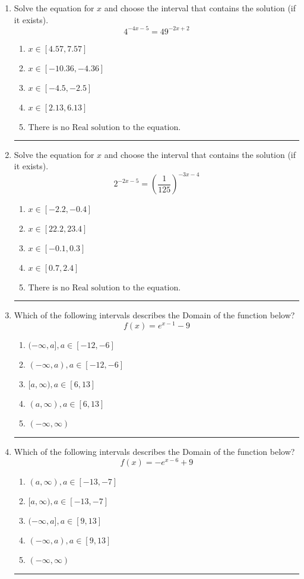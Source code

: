 \documentclass[14pt]{extbook}
\newcommand{\litem}[1]{\item#1\hspace*{-1cm}\rule{\textwidth}{0.4pt}}
\begin{document}
\begin{enumerate}
\litem{
Solve the equation for $x$ and choose the interval that contains the solution (if it exists).\[ 4^{-4x-5} = 49^{-2x+2} \]\begin{enumerate}[label=\Alph*.]
\item \( x \in [4.57, 7.57] \)
\item \( x \in [-10.36, -4.36] \)
\item \( x \in [-4.5, -2.5] \)
\item \( x \in [2.13, 6.13] \)
\item \( \text{There is no Real solution to the equation.} \)

\end{enumerate} }
\litem{
Solve the equation for $x$ and choose the interval that contains the solution (if it exists).\[ 2^{-2x-5} = \left(\frac{1}{125}\right)^{-3x-4} \]\begin{enumerate}[label=\Alph*.]
\item \( x \in [-2.2, -0.4] \)
\item \( x \in [22.2, 23.4] \)
\item \( x \in [-0.1, 0.3] \)
\item \( x \in [0.7, 2.4] \)
\item \( \text{There is no Real solution to the equation.} \)

\end{enumerate} }
\litem{
Which of the following intervals describes the Domain of the function below?\[ f(x) = e^{x-1}-9 \]\begin{enumerate}[label=\Alph*.]
\item \( (-\infty, a], a \in [-12, -6] \)
\item \( (-\infty, a), a \in [-12, -6] \)
\item \( [a, \infty), a \in [6, 13] \)
\item \( (a, \infty), a \in [6, 13] \)
\item \( (-\infty, \infty) \)

\end{enumerate} }
\litem{
Which of the following intervals describes the Domain of the function below?\[ f(x) = -e^{x-6}+9 \]\begin{enumerate}[label=\Alph*.]
\item \( (a, \infty), a \in [-13, -7] \)
\item \( [a, \infty), a \in [-13, -7] \)
\item \( (-\infty, a], a \in [9, 13] \)
\item \( (-\infty, a), a \in [9, 13] \)
\item \( (-\infty, \infty) \)


\end{enumerate}}
\end{enumerate}
\end{document}
